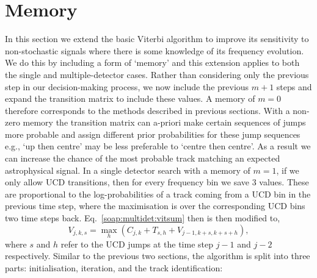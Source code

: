 \section{\label{soap:memory} Memory}
%
%
In this section we extend the basic Viterbi algorithm to improve its sensitivity to non-stochastic signals where there is some knowledge of its frequency evolution.
We do this by including a form of `memory' and this extension applies to both the single and multiple-detector cases.
Rather than considering only the previous step in our decision-making process, we now include the previous $m+1$ steps and expand the transition matrix to include these values.
A memory of $m=0$ therefore corresponds to the methods described in previous sections.
With a non-zero memory the transition matrix can a-priori make certain sequences of jumps more probable and assign different prior probabilities for these jump sequences e.g., `up then centre' may be less preferable to `centre then centre'.
As a result we can increase the chance of the most probable track matching an expected astrophysical signal.
In a single detector search with a memory of $m=1$, if we only allow \gls{UCD} transitions, then for every frequency bin we save 3 values. These are proportional to the log-probabilities of a track coming from a \gls{UCD} bin in the previous time step, where the maximisation is over the corresponding \gls{UCD} bins two time steps back.
Eq.~\ref{soap:multidet:vitsum} then is then modified to,
%
\begin{equation}
\label{soap:memory:stat}
V_{j,k,s} = \max_{h} ({C}_{j,k} + T_{s,h} +  V_{j-1,k+s,k+s+h}),
\end{equation}
%
where $s$ and $h$ refer to the \gls{UCD} jumps at the time step $j-1$ and $j-2$ respectively.  Similar to the previous two sections, the algorithm is split into three parts: initialisation, iteration, and the track identification:

